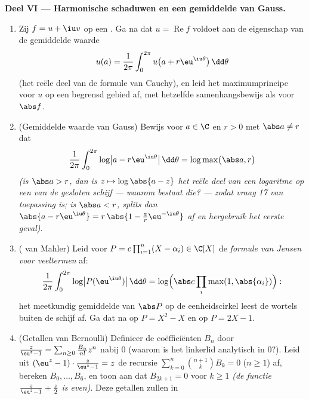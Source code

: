 \begin{problem}
\medskip
\noindent\textbf{Deel VI --- Harmonische schaduwen en een
gemiddelde van Gauss.}
\begin{enumerate}[resume]
  \item Zij $f = u + \iu v$  op een . Ga
        na dat $u = \operatorname{Re}f$ voldoet aan de eigenschap
        van de gemiddelde waarde
        \[
        u(a) = \frac1{2\pi}\int_0^{2\pi}
        u\bigl(a + r\eu^{\iu\theta}\bigr)\,\dd\theta
        \]
        (het reële deel van de formule van Cauchy), en leid het
        maximumprincipe voor $u$ op een begrensd gebied af, met
        hetzelfde samenhangsbewijs als voor $\abs f$.
  \item (Gemiddelde waarde van Gauss) Bewijs voor $a \in \C$ en
        $r > 0$ met $\abs a \neq r$ dat
        \[
        \frac1{2\pi}\int_0^{2\pi}
        \log\bigl|a - r\eu^{\iu\theta}\bigr|\,\dd\theta
        = \log\max\bigl(\abs a, r\bigr)
        \]
        \emph{(is $\abs a > r$, dan is $z \mapsto \log\abs{a -
        z}$ het reële deel van een  logaritme op een
         van de gesloten schijf --- waarom bestaat die?
        --- zodat vraag 17 van toepassing is; is $\abs a < r$,
        splits dan $\abs{a - r\eu^{\iu\theta}} = r\,\abs{1 -
        \frac ar\eu^{-\iu\theta}}$ af en hergebruik het eerste
        geval)}.
  \item ( van Mahler) Leid voor $P = c\prod_{i=1}^n(X -
        \alpha_i) \in \C[X]$ de \emph{formule van Jensen voor
        veeltermen} af:
        \[
        \frac1{2\pi}\int_0^{2\pi}\log\bigl|P(\eu^{\iu\theta})
        \bigr|\,\dd\theta
        = \log\Bigl(\abs c\prod_{i}\max(1,
        \abs{\alpha_i})\Bigr) :
        \]
        het meetkundig gemiddelde van $\abs P$ op de
        eenheidscirkel leest de wortels buiten de schijf af. Ga
        dat na op $P = X^2 - X$ en op $P = 2X - 1$.
  \item (Getallen van Bernoulli) Definieer de coëfficiënten $B_n$
        door $\frac{z}{\eu^z - 1} = \sum_{n\geq0}\frac{B_n}{n!}
        z^n$ nabij $0$ (waarom is het linkerlid analytisch in
        $0$?). Leid uit $(\eu^z - 1)\cdot\frac z{\eu^z-1} = z$ de
        recursie $\sum_{k=0}^{n}\binom{n+1}kB_k = 0$ ($n \geq 1$)
        af, bereken $B_0, \dots, B_6$, en toon aan dat $B_{2k+1}
        = 0$ voor $k \geq 1$ \emph{(de functie $\frac
        z{\eu^z-1} + \frac z2$ is even)}. Deze getallen zullen in

\end{enumerate}
\end{problem}
